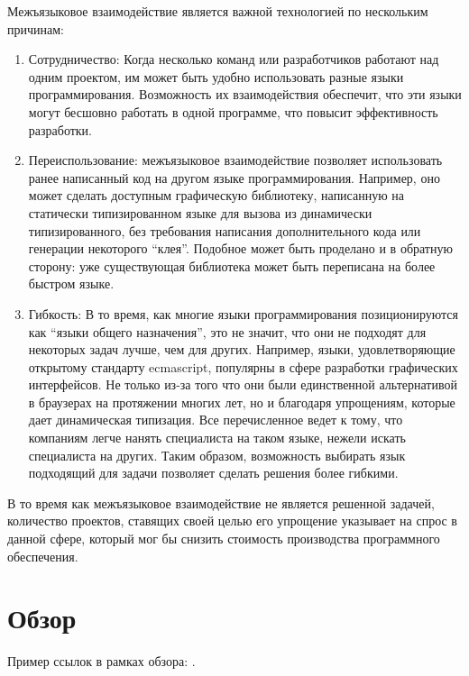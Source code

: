 \documentclass[times,specification,annotation]{itmo-student-thesis}
\begin{document}
Межъязыковое взаимодействие является важной технологией по нескольким причинам:

\begin{enumerate}
\item Сотрудничество: Когда несколько команд или разработчиков работают над одним проектом, им может быть удобно использовать разные языки программирования. Возможность их взаимодействия обеспечит, что эти языки могут бесшовно работать в одной программе, что повысит эффективность разработки.

\item Переиспользование: межъязыковое взаимодействие позволяет использовать ранее написанный код на другом языке программирования. Например, оно может сделать доступным графическую библиотеку, написанную на статически типизированном языке для вызова из динамически типизированного, без требования написания дополнительного кода или генерации некоторого ``клея''. Подобное может быть проделано и в обратную сторону: уже существующая библиотека может быть переписана на более быстром языке.

\item Гибкость: В то время, как многие языки программирования позиционируются как ``языки общего назначения'', это не значит, что они не подходят для некоторых задач лучше, чем для других. Например, языки, удовлетворяющие открытому стандарту ecmascript, популярны в сфере разработки графических интерфейсов. Не только из-за того что они были единственной альтернативой в браузерах на протяжении многих лет, но и благодаря упрощениям, которые дает динамическая типизация. Все перечисленное ведет к тому, что компаниям легче нанять специалиста на таком языке, нежели искать специалиста на других. Таким образом, возможность выбирать язык подходящий для задачи позволяет сделать решения более гибкими.
\end{enumerate}

В то время как межъязыковое взаимодействие не является решенной задачей, количество проектов, ставящих своей целью его упрощение указывает на спрос в данной сфере, который мог бы снизить стоимость производства программного обеспечения.

\chapter{Обзор}

\startrelatedwork
Пример ссылок в рамках обзора: \cite{example-english, example-russian, unrestricted-jump-evco, doerr-doerr-lambda-lambda-self-adjustment-arxiv}.
\end{document}
